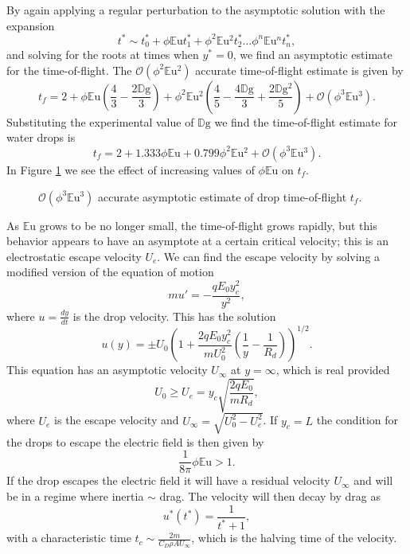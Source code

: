 \documentclass[12pt,a4paper,oneside]{book}
\begin{document}
By again applying a regular perturbation to the asymptotic solution with the expansion
\[ t^* \sim t^*_0 + \phi \mathbb{E}\mbox{u} t^*_1 + \phi^2 \mathbb{E}\mbox{u}^2 t^*_2 \ldots \phi^n \mathbb{E}\mbox{u}^n t^*_n  
,\]
and solving for the roots at times when $y^* = 0$, we find an asymptotic estimate for the time-of-flight. The $\mathcal{O}(\phi^2 \mathbb{E}\mbox{u}^2)$ accurate time-of-flight estimate is given by
\[t_f = 2 + \phi \mathbb{E}\mbox{u} \left(\frac{4}{3} - \frac{2 \mathbb{D}\mbox{g}}{3}\right) + \phi^2 \mathbb{E}\mbox{u}^{2} \left(\frac{4}{5} - \frac{4 \mathbb{D}\mbox{g}}{3} + \frac{2 \mathbb{D}\mbox{g}^{2}}{5}\right) + \mathcal{O}(\phi^3 \mathbb{E}\mbox{u}^3).\]
Substituting the experimental value of $\mathbb{D}\mbox{g}$ we find the time-of-flight estimate for water drops is
\begin{equation} \label{time_of_flight}
t_f = 2 + 1.333 \phi \mathbb{E}\mbox{u} + 0.799 \phi^2 \mathbb{E}\mbox{u}^{2} + \mathcal{O}(\phi^3 \mathbb{E}\mbox{u}^3). 
\end{equation} 
In Figure \ref{fig:drag} we see the effect of increasing values of $\phi \mathbb{E}\mbox{u}$ on $t_f$.
\begin{figure}[htb]
    \centering
    
    \caption{$\mathcal{O}(\phi^3 \mathbb{E}\mbox{u}^3)$ accurate asymptotic estimate of drop time-of-flight $t_f$.}
    \label{fig:drag}
\end{figure}
As $\mathbb{E}\mbox{u}$ grows to be no longer small, the time-of-flight grows rapidly, but this behavior appears to have an asymptote at a certain critical velocity; this is an electrostatic escape velocity $U_e$. We can find the escape velocity by solving a modified version of the equation of motion
\[ m u' = - \frac{q E_0 y_c^2}{y^2}, \]
where $u = \frac{d y}{d t}$ is the drop velocity. This has the solution
\[ u(y) = \pm U_0 \left(1 + \frac{2q E_0 y_c^2}{m U_0^2} \left( \frac{1}{y} - \frac{1}{R_d} \right) \right)^{1/2}.
\]
This equation has an asymptotic velocity $U_{\infty}$ at $y = \infty$, which is real provided 
\[ U_0 \geq  U_e = y_c \sqrt{\frac{2 q E_0 }{m R_d}},
\]
where $U_e$ is the escape velocity and $U_{\infty} = \sqrt{U_0^2 - U_e^2}$. If $y_c=L$ the condition for the drops to escape the electric field is then given by
\begin{equation}\label{escape}
\frac{1}{8 \pi} \phi \mathbb{E}\mbox{u} > 1.
\end{equation}
If the drop escapes the electric field it will have a residual velocity $U_{\infty}$ and will be in a regime where inertia $\sim$ drag. The velocity will then decay by drag as
\[
u^*(t^*) = \frac{1}{t^* + 1},
\]
with a characteristic time $t_c \sim \frac{2 m}{C_D \rho A U_{\infty}}$, which is the halving time of the velocity.
\end{document}
